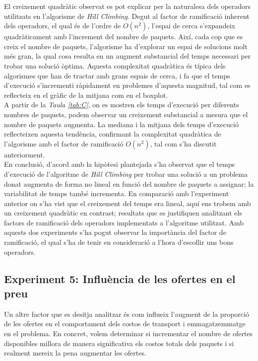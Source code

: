 \documentclass[a4paper]{article}
\begin{document}
	El creixement quadràtic observat es pot explicar per la naturalesa dels operadors utilitzats en l'algorisme de \textit{Hill Climbing}. Degut al factor de ramificació inherent dels operadors, el qual és de l'ordre de $O(n^2)$, l'espai de cerca s'expandeix quadràticament amb l'increment del nombre de paquets. Així, cada cop que es creix el nombre de paquets, l'algorisme ha d'explorar un espai de solucions molt més gran, la qual cosa resulta en un augment substancial del temps necessari per trobar una solució òptima. Aquesta complexitat quadràtica és típica dels algorismes que han de tractar amb grans espais de cerca, i fa que el temps d'execució s'incrementi ràpidament en problemes d'aquesta magnitud, tal com es reflecteix en el gràfic de la mitjana com en el boxplot.\\
	A partir de la \textit{Taula \ref{tab:C}}, on es mostren els temps d'execució per diferents nombres de paquets, podem observar un creixement substancial a mesura que el nombre de paquets augmenta. La mediana i la mitjana dels temps d'execució reflecteixen aquesta tendència, confirmant la complexitat quadràtica de l'algorisme amb el factor de ramificació $O(n^2)$, tal com s'ha discutit anteriorment.\\
	
	En conclusió, d'acord amb la hipòtesi plantejada s'ha observat que el temps d'execució de l'algoritme de \textit{Hill Climbing} per trobar una solució a un problema donat augmenta de forma no lineal en funció del nombre de paquets a assignar; la variabilitat de temps també incrementa. En comparació amb l'experiment anterior on s'ha vist que el creixement del temps era lineal, aquí ens trobem amb un creixement quadràtic en contrast; resultats que es justifiquen analitzant els factors de ramificació dels operadors implementats a l'algoritme utilitzat. Amb aquests dos experiments s'ha pogut observar la importància del factor de ramificació, el qual s'ha de tenir en consideració a l'hora d'escollir uns bons operadors.\\


	\subsection{Experiment 5: Influència de les ofertes en el preu}
	Un altre factor que es desitja analitzar és com influeix l'augment de la proporció de les ofertes en el comportament dels costos de transport i emmagatzemmatge en el problema. En concret, volem determinar si incrementar el nombre de ofertes disponibles millora de manera significativa els costos totals dels paquets i si realment mereix la pena augmentar les ofertes.\\
	
\end{document}
